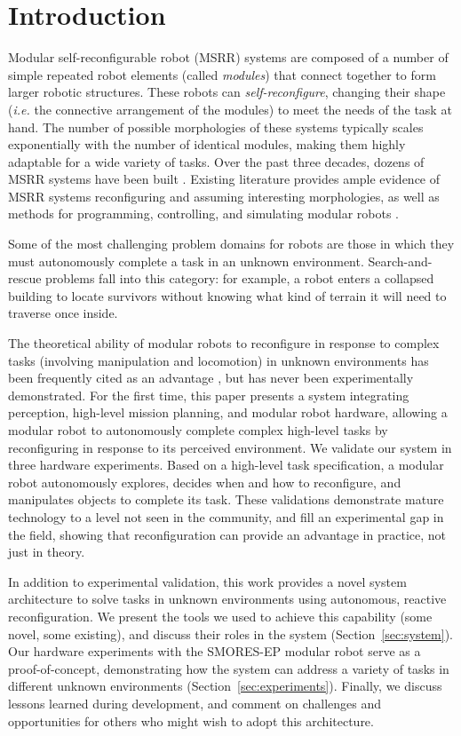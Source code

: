 \documentclass[journal]{IEEEtran}
\begin{document}
\section{Introduction} \label{sec:introduction}
%
Modular self-reconfigurable robot (MSRR) systems are composed of a number of simple repeated robot elements (called \emph{modules}) that connect together to form larger robotic structures. These robots can \emph{self-reconfigure}, changing their shape (\emph{i.e.} the connective arrangement of the modules) to meet the needs of the task at hand.
The number of possible morphologies of these systems typically scales exponentially with the number of identical modules, making them highly adaptable for a wide variety of tasks.
Over the past three decades, dozens of MSRR systems have been built \cite{Yim2007a}. Existing literature provides ample evidence of MSRR systems reconfiguring and assuming interesting morphologies, as well as methods for programming, controlling, and simulating modular robots \cite{Yim2007,Jing2016,Yim1994}.

Some of the most challenging problem domains for robots are those in which they must autonomously complete a task in an unknown environment. Search-and-rescue problems fall into this category: for example, a robot enters a collapsed building to locate survivors without knowing what kind of terrain it will need to traverse once inside.

The theoretical ability of modular robots to reconfigure in response to complex tasks (involving manipulation and locomotion) in unknown environments has been frequently cited as an advantage \cite{Yim2007a}, but has never been experimentally demonstrated.
For the first time, this paper presents a system integrating perception, high-level mission planning, and modular robot hardware, allowing a modular robot to autonomously complete complex high-level tasks by reconfiguring in response to its perceived environment.
We validate our system in three hardware experiments.  Based on a high-level task specification, a modular robot autonomously explores, decides when and how to reconfigure, and manipulates objects to complete its task.
These validations demonstrate mature technology to a level not seen in the community, and fill an experimental gap in the field, showing that reconfiguration can provide an advantage in practice, not just in theory.

In addition to experimental validation, this work provides a novel system architecture to solve tasks in unknown environments using autonomous, reactive reconfiguration.  We present the tools we used to achieve this capability (some novel, some existing), and discuss their roles in the system (Section~\ref{sec:system}).  Our hardware experiments with the SMORES-EP modular robot serve as a proof-of-concept, demonstrating how the system can address a variety of tasks in different unknown environments (Section~\ref{sec:experiments}).  Finally, we discuss lessons learned during development, and comment on challenges and opportunities for others who might wish to adopt this architecture.
\end{document}

